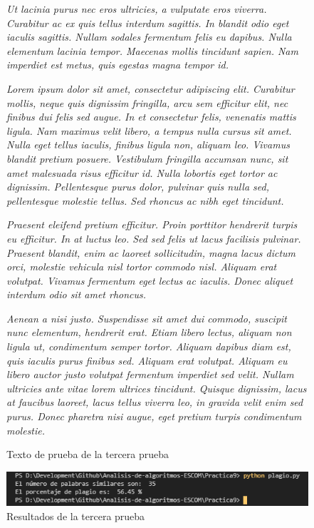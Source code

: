 \documentclass[12pt,twoside]{article}
\begin{document}
\begin{figure}
    \centering
    \textit{Ut lacinia purus nec eros ultricies, a vulputate eros viverra. 
Curabitur ac ex quis tellus interdum sagittis. In blandit odio 
eget iaculis sagittis. Nullam sodales fermentum felis eu dapibus. 
Nulla elementum lacinia tempor. Maecenas mollis tincidunt sapien. 
Nam imperdiet est metus, quis egestas magna tempor id.}

\textit{Lorem ipsum dolor sit amet, consectetur adipiscing elit. 
Curabitur mollis, neque quis dignissim fringilla, arcu sem 
efficitur elit, nec finibus dui felis sed augue. In et consectetur 
felis, venenatis mattis ligula. Nam maximus velit libero, a tempus nulla 
cursus sit amet. Nulla eget tellus iaculis, finibus ligula non, 
aliquam leo. Vivamus blandit pretium posuere. Vestibulum fringilla 
accumsan nunc, sit amet malesuada risus efficitur id. Nulla 
lobortis eget tortor ac dignissim. Pellentesque purus dolor, 
pulvinar quis nulla sed, pellentesque molestie tellus. Sed rhoncus 
ac nibh eget tincidunt.}

\textit{Praesent eleifend pretium efficitur. Proin porttitor hendrerit 
turpis eu efficitur. In at luctus leo. Sed sed felis ut lacus 
facilisis pulvinar. Praesent blandit, enim ac laoreet sollicitudin, 
magna lacus dictum orci, molestie vehicula nisl tortor commodo nisl. 
Aliquam erat volutpat. Vivamus fermentum eget lectus ac iaculis. 
Donec aliquet interdum odio sit amet rhoncus.}

\textit{Aenean a nisi justo. Suspendisse sit amet dui commodo, 
suscipit nunc elementum, hendrerit erat. Etiam libero lectus, 
aliquam non ligula ut, condimentum semper tortor. Aliquam dapibus 
diam est, quis iaculis purus finibus sed. Aliquam erat volutpat. 
Aliquam eu libero auctor justo volutpat fermentum imperdiet sed 
velit. Nullam ultricies ante vitae lorem ultrices tincidunt. 
Quisque dignissim, lacus at faucibus laoreet, lacus tellus viverra 
leo, in gravida velit enim sed purus. Donec pharetra nisi augue, 
eget pretium turpis condimentum molestie.}
    \caption{Texto de prueba de la tercera prueba}
    \label{fig:texto32}
\end{figure}

\begin{figure}[ht]
    \centering
    \includegraphics[width=1\textwidth]{3.png}
    \caption{Resultados de la tercera prueba} 
    \label{fig:tercera}
\end{figure}
\end{document}
